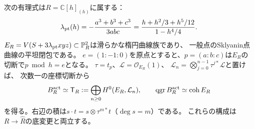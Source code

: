 \begin{proposition}[中心商の相対的な点曲線表示]
\label{gre:prop:elliptic-quotient}
次の有理式は$R=\mathbb C[h]_{(h)}$に属する：
\begin{equation}\label{gre:eq:point-parameter}
 \lambda_{\rm pt}(h)
 =-\frac{a^3+b^3+c^3}{3abc}
 =\frac{h+h^2/3+h^5/12}{1-h^4/4}.
\end{equation}
$E_R=V(S+3\lambda_{\rm pt}xyz)\subset\mathbb P^2_R$は滑らかな楕円曲線族であり、
一般点のSklyanin点曲線の平坦閉包である。
$e=(1:-1:0)$を原点とすると、$p=(a:b:c)$は$E_R$の切断で$p\bmod h=e$となる。
$\tau=t_p$、$\mathcal L=\mathcal O_{E_R}(1)$、
$\mathcal L_n=\bigotimes_{j=0}^{n-1}\tau^{j*}\mathcal L$と置けば、
次数一の座標切断から
\begin{equation}\label{gre:eq:relative-thcr}
 B_R^{\rm act}\simeq
 \mathsf T_R:=\bigoplus_{n\ge0}H^0(E_R,\mathcal L_n),
 \qquad
 \operatorname{qgr}B_R^{\rm act}\simeq\operatorname{coh}E_R
\end{equation}
を得る。右辺の積は$s\cdot t=s\otimes\tau^{m*}t$（$\deg s=m$）である。
これらの構成は$R\to\widehat R$の底変更と両立する。
\end{proposition}
